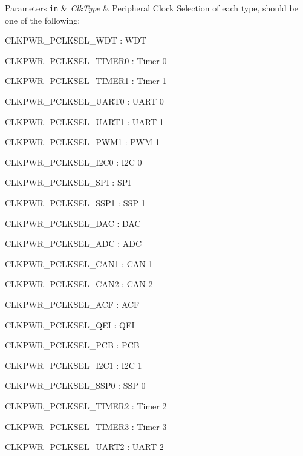 \begin{DoxyParams}[1]{Parameters}
\mbox{\tt in}  & {\em Clk\+Type} & Peripheral Clock Selection of each type, should be one of the following\+:
\begin{DoxyItemize}
\item C\+L\+K\+P\+W\+R\+\_\+\+P\+C\+L\+K\+S\+E\+L\+\_\+\+W\+DT \+: W\+DT
\item C\+L\+K\+P\+W\+R\+\_\+\+P\+C\+L\+K\+S\+E\+L\+\_\+\+T\+I\+M\+E\+R0 \+: Timer 0
\item C\+L\+K\+P\+W\+R\+\_\+\+P\+C\+L\+K\+S\+E\+L\+\_\+\+T\+I\+M\+E\+R1 \+: Timer 1
\item C\+L\+K\+P\+W\+R\+\_\+\+P\+C\+L\+K\+S\+E\+L\+\_\+\+U\+A\+R\+T0 \+: U\+A\+RT 0
\item C\+L\+K\+P\+W\+R\+\_\+\+P\+C\+L\+K\+S\+E\+L\+\_\+\+U\+A\+R\+T1 \+: U\+A\+RT 1
\item C\+L\+K\+P\+W\+R\+\_\+\+P\+C\+L\+K\+S\+E\+L\+\_\+\+P\+W\+M1 \+: P\+WM 1
\item C\+L\+K\+P\+W\+R\+\_\+\+P\+C\+L\+K\+S\+E\+L\+\_\+\+I2\+C0 \+: I2C 0
\item C\+L\+K\+P\+W\+R\+\_\+\+P\+C\+L\+K\+S\+E\+L\+\_\+\+S\+PI \+: S\+PI
\item C\+L\+K\+P\+W\+R\+\_\+\+P\+C\+L\+K\+S\+E\+L\+\_\+\+S\+S\+P1 \+: S\+SP 1
\item C\+L\+K\+P\+W\+R\+\_\+\+P\+C\+L\+K\+S\+E\+L\+\_\+\+D\+AC \+: D\+AC
\item C\+L\+K\+P\+W\+R\+\_\+\+P\+C\+L\+K\+S\+E\+L\+\_\+\+A\+DC \+: A\+DC
\item C\+L\+K\+P\+W\+R\+\_\+\+P\+C\+L\+K\+S\+E\+L\+\_\+\+C\+A\+N1 \+: C\+AN 1
\item C\+L\+K\+P\+W\+R\+\_\+\+P\+C\+L\+K\+S\+E\+L\+\_\+\+C\+A\+N2 \+: C\+AN 2
\item C\+L\+K\+P\+W\+R\+\_\+\+P\+C\+L\+K\+S\+E\+L\+\_\+\+A\+CF \+: A\+CF
\item C\+L\+K\+P\+W\+R\+\_\+\+P\+C\+L\+K\+S\+E\+L\+\_\+\+Q\+EI \+: Q\+EI
\item C\+L\+K\+P\+W\+R\+\_\+\+P\+C\+L\+K\+S\+E\+L\+\_\+\+P\+CB \+: P\+CB
\item C\+L\+K\+P\+W\+R\+\_\+\+P\+C\+L\+K\+S\+E\+L\+\_\+\+I2\+C1 \+: I2C 1
\item C\+L\+K\+P\+W\+R\+\_\+\+P\+C\+L\+K\+S\+E\+L\+\_\+\+S\+S\+P0 \+: S\+SP 0
\item C\+L\+K\+P\+W\+R\+\_\+\+P\+C\+L\+K\+S\+E\+L\+\_\+\+T\+I\+M\+E\+R2 \+: Timer 2
\item C\+L\+K\+P\+W\+R\+\_\+\+P\+C\+L\+K\+S\+E\+L\+\_\+\+T\+I\+M\+E\+R3 \+: Timer 3
\item C\+L\+K\+P\+W\+R\+\_\+\+P\+C\+L\+K\+S\+E\+L\+\_\+\+U\+A\+R\+T2 \+: U\+A\+RT 2

\end{DoxyItemize}
\end{DoxyParams}
